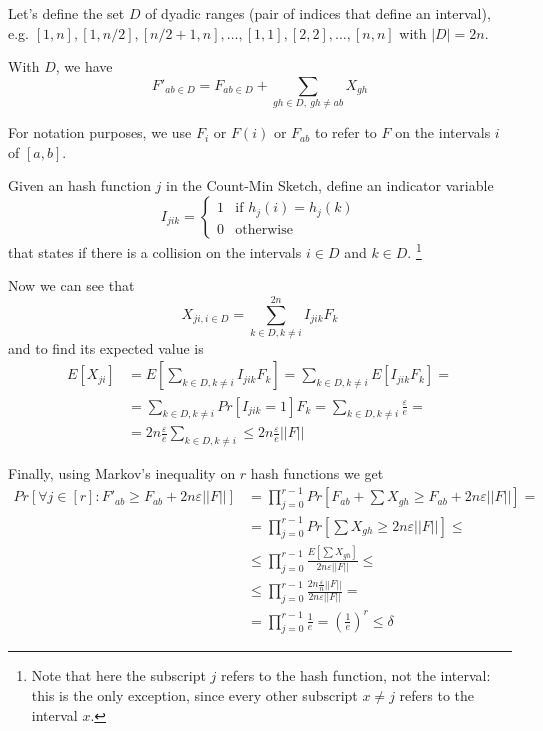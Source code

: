 \documentclass{article}
\begin{document}
Let's define the set $D$ of dyadic ranges (pair of indices that define an interval), e.g. $[1,n],[1,n/2],[n/2+1,n],\ldots,[1,1],[2,2],\ldots,[n,n]$ with $|D|=2n$.

With $D$, we have $$F'_{ab\in D}=F_{ab\in D}+\sum_{gh\in D,\ gh\neq ab}X_{gh}$$

For notation purposes, we use $F_i$ or $F(i)$ or $F_{ab}$ to refer to $F$ on the intervals $i$ of $[a,b]$.

Given an hash function $j$ in the Count-Min Sketch, define an indicator variable $$I_{jik}=\begin{cases} 1 & \text{if }h_j(i)=h_j(k)\\0 & \text{otherwise}\end{cases}$$ that states if there is a collision on the intervals $i\in D$ and $k\in D$. \footnote{Note that here the subscript $j$ refers to the hash function, not the interval: this is the only exception, since every other subscript $x\neq j$ refers to the interval $x$.}

Now we can see that $$X_{ji,i\in D}=\sum_{k\in D,k\neq i}^{2n}I_{jik}F_k$$ and to find its expected value is
\begin{align*}
    E[X_{ji}]&=E\left[\sum_{k\in D, k\neq i}I_{jik}F_k\right]=\sum_{k\in D, k\neq i}E[I_{jik}F_k]=\\
    &= \sum_{k\in D, k\neq i}Pr[I_{jik}=1]F_k=\sum_{k\in D, k\neq i}\frac{\varepsilon}{e}=\\
    &= 2n\frac{\varepsilon}{e}\sum_{k\in D, k\neq i}\leq 2n\frac{\varepsilon}{e}||F||
\end{align*}

Finally, using Markov's inequality on $r$ hash functions we get 
\begin{align*}
    Pr\left[\forall j\in [r]:F'_{ab}\geq F_{ab}+2n\varepsilon ||F||\right]&=\prod_{j=0}^{r-1} Pr\left[F_{ab}+\sum X_{gh} \geq F_{ab}+2n\varepsilon ||F||\right]=\\
    &=\prod_{j=0}^{r-1}Pr\left[\sum X_{gh} \geq 2n\varepsilon ||F||\right]\leq\\
    &\leq \prod_{j=0}^{r-1}\frac{E[\sum X_{gh}]}{2n\varepsilon ||F||} \leq\\
    &\leq \prod_{j=0}^{r-1}\frac{2n\frac{\varepsilon}{n} ||F||}{2n\varepsilon ||F||}=\\
    &=\prod_{j=0}^{r-1}\frac{1}{e}=\left(\frac{1}{e}\right)^r\leq \delta
\end{align*}
\end{document}
